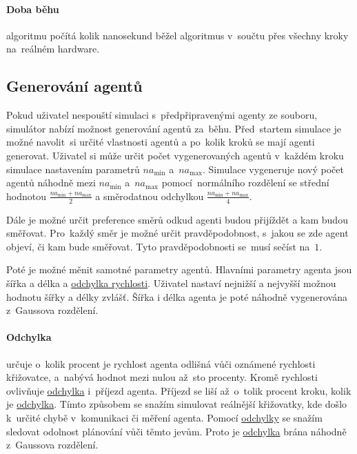 \paragraph{Doba běhu}\label{par:doba_behu} algoritmu počítá kolik nanosekund běžel algoritmus
v~součtu přes všechny kroky na~reálném hardware.

\subsection{Generování agentů}\label{subsec:generovani_agentu}


Pokud uživatel nespouští simulaci s~předpřipravenými agenty ze souboru,
simulátor nabízí možnost generování agentů za~běhu.
Před~startem simulace je možné navolit~si určité vlastnosti agentů a po~kolik kroků se mají agenti generovat.
Uživatel si může určit počet vygenerovaných agentů v~každém kroku simulace nastavením parametrů $na_{\min}$ a~$na_{\max}$.
Simulace vygeneruje nový počet agentů náhodně mezi $na_{\min}$ a~$na_{\max}$
pomocí~normálního rozdělení se střední hodnotou $\frac{na_{\min} + na_{\max}}{2}$
a směrodatnou odchylkou $\frac{na_{\min} + na_{\max}}{4}$.

Dále je možné určit preference směrů odkud agenti budou přijíždět a kam budou směřovat.
Pro~každý směr je možné určit pravděpodobnost, s~jakou se zde agent objeví, či kam bude směřovat.
Tyto pravděpodobnosti se~musí sečíst na~$1$.

Poté je možné měnit samotné parametry agentů.
Hlavními parametry agenta jsou šířka a délka a \hyperref[par:odchylka]{odchylka rychlosti}.
Uživatel nastaví nejnižší a nejvyšší možnou hodnotu šířky a délky zvlášť.
Šířka i délka agenta je poté náhodně vygenerována z~Gaussova rozdělení.

\paragraph{Odchylka}\label{par:odchylka} určuje o~kolik procent je rychlost agenta odlišná
vůči oznámené rychlosti křižovatce, a~nabývá hodnot mezi nulou až~sto procenty.
Kromě rychlosti ovlivňuje \hyperref[par:odchylka]{odchylka} i~příjezd agenta.
Příjezd se liší až~o~tolik procent kroku, kolik je \hyperref[par:odchylka]{odchylka}.
Tímto způsobem se snažím simulovat reálnější křižovatky, kde došlo k~určité chybě v~komunikaci či měření agenta.
Pomocí \hyperref[par:odchylka]{odchylky} se snažím sledovat odolnost plánování vůči těmto jevům.
Proto je \hyperref[par:odchylka]{odchylka} brána náhodně z~Gaussova rozdělení.
